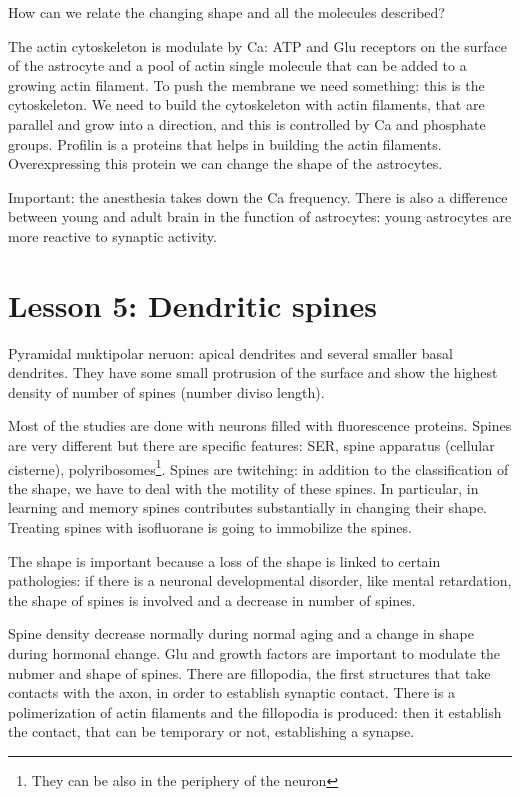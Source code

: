 \documentclass[a4paper, 12pt]{book}
\begin{document}
How can we relate the changing shape and all the molecules described?

The actin cytoskeleton is modulate by Ca: ATP and Glu receptors on the surface of the astrocyte and a pool of actin single molecule that can be added to a growing actin filament. To push the membrane we need something: this is the cytoskeleton. We need to build the cytoskeleton with actin filaments, that are parallel and grow into a direction, and this is controlled by Ca and phosphate groups. Profilin is a proteins that helps in building the actin filaments. Overexpressing this protein we can change the shape of the astrocytes.

Important: the anesthesia takes down the Ca frequency. There is also a difference between young and adult brain in the function of astrocytes: young astrocytes are more reactive to synaptic activity.


\chapter{Lesson 5: Dendritic spines}
Pyramidal muktipolar neruon: apical dendrites and several smaller basal dendrites. They have some small protrusion of the surface and show the highest density of number of spines (number diviso length). 

Most of the studies are done with neurons filled with fluorescence proteins. Spines are very different but there are specific features: SER, spine apparatus (cellular cisterne), polyribosomes\footnote{They can be also in the periphery of the neuron}. Spines are twitching: in addition to the classification of the shape, we have to deal with the motility of these spines. In particular, in learning  and memory spines contributes substantially in changing their shape. Treating spines with isofluorane is going to immobilize the spines.

The shape is important because a loss of the shape is linked to certain pathologies: if there is a neuronal developmental disorder, like mental retardation, the shape of spines is involved and a decrease in number of spines.

Spine density decrease normally during normal aging and a change in shape during hormonal change. Glu and growth factors are important to modulate the nubmer and shape of spines. There are fillopodia, the first structures that take contacts with the axon, in order to establish synaptic contact. There is a polimerization of actin filaments and the fillopodia is produced: then it establish the contact, that can be temporary or not, establishing a synapse.
\end{document}
